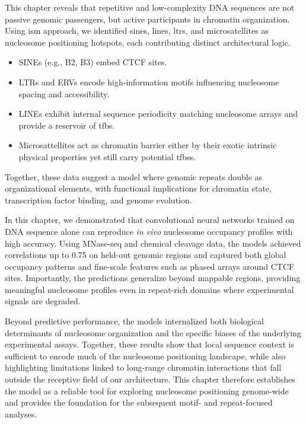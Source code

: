 \documentclass[11pt]{book}
\begin{document}
\vspace{1cm}
\begin{tcolorbox}[title=Chapter summary, colframe=pink, colback=pink!10!white,coltitle=black, breakable, fonttitle=\bfseries]
This chapter reveals that repetitive and low-complexity DNA sequences are not passive genomic passengers, but active participants in chromatin organization. Using \gls{ism} approach, we identified \glspl{sine}, \glspl{line}, \glspl{ltr}, and microsatellites as nucleosome positioning hotspots, each contributing distinct architectural logic.
\begin{itemize}
    \item SINEs (e.g., B2, B3) embed CTCF sites.
    \item LTRs and ERVs encode high-information motifs influencing nucleosome spacing and accessibility.
    \item LINEs exhibit internal sequence periodicity matching nucleosome arrays and provide a reservoir of \gls{tfbs}.
    \item Microsattellites act as chromatin barrier either by their exotic intrinsic physical properties yet still carry potential \glspl{tfbs}.
\end{itemize}

Together, these data suggest a model where genomic repeats double as organizational elements, with functional implications for chromatin state, transcription factor binding, and genome evolution.
\end{tcolorbox}

In this chapter, we demonstrated that convolutional neural networks trained on DNA sequence alone can reproduce \textit{in vivo} nucleosome occupancy profiles with high accuracy. Using MNase-seq and chemical cleavage data, the models achieved correlations up to 0.75 on held-out genomic regions and captured both global occupancy patterns and fine-scale features such as phased arrays around CTCF sites. Importantly, the predictions generalize beyond mappable regions, providing meaningful nucleosome profiles even in repeat-rich domains where experimental signals are degraded. 

Beyond predictive performance, the models internalized both biological determinants of nucleosome organization and the specific biases of the underlying experimental assays. Together, these results show that local sequence context is sufficient to encode much of the nucleosome positioning landscape, while also highlighting limitations linked to long-range chromatin interactions that fall outside the receptive field of our architecture. This chapter therefore establishes the model as a reliable tool for exploring nucleosome positioning genome-wide and provides the foundation for the subsequent motif- and repeat-focused analyses.
\end{document}
